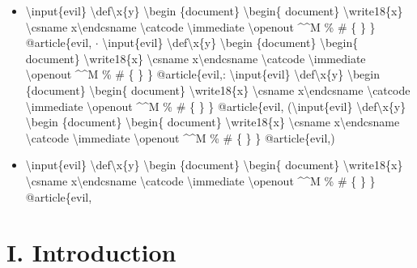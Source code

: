 \documentclass[journal]{IEEEtran}
\begin{document}
\begin{itemize}
\item \textbackslash{}input\{evil\} \textbackslash{}def\textbackslash{}x\{y\} \textbackslash{}begin \{document\} \textbackslash{}begin\{ document\} \textbackslash{}write18\{x\} \textbackslash{}csname x\textbackslash{}endcsname \textbackslash{}catcode \textbackslash{}immediate \textbackslash{}openout \textasciicircum{}\textasciicircum{}M \% \# \{ \} \} @article\{evil, \ensuremath{\cdot} \textbackslash{}input\{evil\} \textbackslash{}def\textbackslash{}x\{y\} \textbackslash{}begin \{document\} \textbackslash{}begin\{ document\} \textbackslash{}write18\{x\} \textbackslash{}csname x\textbackslash{}endcsname \textbackslash{}catcode \textbackslash{}immediate \textbackslash{}openout \textasciicircum{}\textasciicircum{}M \% \# \{ \} \} @article\{evil,: \textbackslash{}input\{evil\} \textbackslash{}def\textbackslash{}x\{y\} \textbackslash{}begin \{document\} \textbackslash{}begin\{ document\} \textbackslash{}write18\{x\} \textbackslash{}csname x\textbackslash{}endcsname \textbackslash{}catcode \textbackslash{}immediate \textbackslash{}openout \textasciicircum{}\textasciicircum{}M \% \# \{ \} \} @article\{evil, (\textbackslash{}input\{evil\} \textbackslash{}def\textbackslash{}x\{y\} \textbackslash{}begin \{document\} \textbackslash{}begin\{ document\} \textbackslash{}write18\{x\} \textbackslash{}csname x\textbackslash{}endcsname \textbackslash{}catcode \textbackslash{}immediate \textbackslash{}openout \textasciicircum{}\textasciicircum{}M \% \# \{ \} \} @article\{evil,)
\item \textbackslash{}input\{evil\} \textbackslash{}def\textbackslash{}x\{y\} \textbackslash{}begin \{document\} \textbackslash{}begin\{ document\} \textbackslash{}write18\{x\} \textbackslash{}csname x\textbackslash{}endcsname \textbackslash{}catcode \textbackslash{}immediate \textbackslash{}openout \textasciicircum{}\textasciicircum{}M \% \# \{ \} \} @article\{evil,
\end{itemize}

\section*{I. Introduction}
\end{document}
